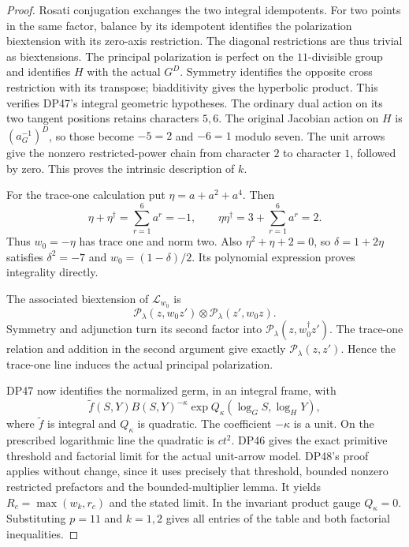 \documentclass[11pt,a4paper]{article}
\theoremstyle{definition}\newtheorem{remark}[theorem]{Remark}
\begin{document}
\begin{proof}
Rosati conjugation exchanges the two integral idempotents.
For two points in the same factor, balance by its idempotent identifies the polarization biextension with its zero-axis restriction.
The diagonal restrictions are thus trivial as biextensions.
The principal polarization is perfect on the $11$-divisible group and identifies $H$ with the actual $G^D$.
Symmetry identifies the opposite cross restriction with its transpose; biadditivity gives the hyperbolic product.
This verifies DP47's integral geometric hypotheses.
The ordinary dual action on its two tangent positions retains characters $5,6$.
The original Jacobian action on $H$ is $(a_G^{-1})^D$, so those become $-5=2$ and $-6=1$ modulo seven.
The unit arrows give the nonzero restricted-power chain from character $2$ to character $1$, followed by zero.
This proves the intrinsic description of $k$.

For the trace-one calculation put $\eta=a+a^2+a^4$.
Then
\[
 \eta+\eta^\dagger=\sum_{r=1}^6a^r=-1,\qquad
 \eta\eta^\dagger=3+\sum_{r=1}^6a^r=2.
\]
Thus $w_0=-\eta$ has trace one and norm two.
Also $\eta^2+\eta+2=0$, so $\delta=1+2\eta$ satisfies
$\delta^2=-7$ and $w_0=(1-\delta)/2$.
Its polynomial expression proves integrality directly.

The associated biextension of $\mathcal L_{w_0}$ is
\[
 \mathcal P_\lambda(z,w_0z')\otimes
 \mathcal P_\lambda(z',w_0z).
\]
Symmetry and adjunction turn its second factor into
$\mathcal P_\lambda(z,w_0^\dagger z')$.
The trace-one relation and addition in the second argument give exactly
$\mathcal P_\lambda(z,z')$.
Hence the trace-one line induces the actual principal polarization.

DP47 now identifies the normalized germ, in an integral frame, with
\[
 \widetilde f(S,Y)B(S,Y)^{-\kappa}
       \exp Q_\kappa(\log_GS,\log_HY),
\]
where $\widetilde f$ is integral and $Q_\kappa$ is quadratic.
The coefficient $-\kappa$ is a unit.
On the prescribed logarithmic line the quadratic is $ct^2$.
DP46 gives the exact primitive threshold and factorial limit for the actual unit-arrow model.
DP48's proof applies without change, since it uses precisely that threshold, bounded nonzero restricted prefactors and the bounded-multiplier lemma.
It yields $R_c=\max(w_k,r_c)$ and the stated limit.
In the invariant product gauge $Q_\kappa=0$.
Substituting $p=11$ and $k=1,2$ gives all entries of the table and both factorial inequalities.


\end{proof}
\end{document}
